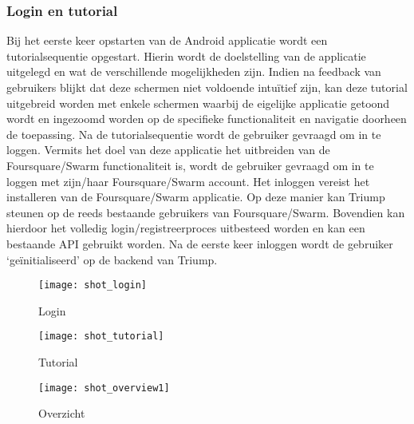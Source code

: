 \subsubsection{Login en tutorial} %
Bij het eerste keer opstarten van de Android applicatie wordt een tutorialsequentie opgestart. Hierin wordt de doelstelling van de applicatie uitgelegd en wat de verschillende mogelijkheden zijn. Indien na feedback van gebruikers blijkt dat deze schermen niet voldoende intuïtief zijn, kan deze tutorial uitgebreid worden met enkele schermen waarbij de eigelijke applicatie getoond wordt en ingezoomd worden op de specifieke functionaliteit en navigatie doorheen de toepassing. 
Na de tutorialsequentie wordt de gebruiker gevraagd om in te loggen. Vermits het doel van deze applicatie het uitbreiden van de Foursquare/Swarm functionaliteit is, wordt de gebruiker gevraagd om in te loggen met zijn/haar Foursquare/Swarm account. Het inloggen vereist het installeren van de Foursquare/Swarm applicatie. Op deze manier kan Triump steunen op de reeds bestaande gebruikers van Foursquare/Swarm. Bovendien kan hierdoor het volledig login/registreerproces uitbesteed worden en kan een bestaande API gebruikt worden.
Na de eerste keer inloggen wordt de gebruiker `geïnitialiseerd' op de backend van Triump.
\begin{figure}[ht]
\begin{minipage}[b]{0.20\linewidth}
\centering
\texttt{[image: shot\_login]}
\caption{Login}
\label{fig:screenshot_profile}
\end{minipage}
\hspace{2.4cm}
\begin{minipage}[b]{0.20\linewidth}
\centering
\texttt{[image: shot\_tutorial]}
\caption{Tutorial}
\label{fig:screenshot_login}
\end{minipage}
\hspace{2.4cm}
\begin{minipage}[b]{0.20\linewidth}
\centering
\texttt{[image: shot\_overview1]}
\caption{Overzicht}
\label{fig:screenshot_overview}
\end{minipage}
\end{figure}
\clearpage
